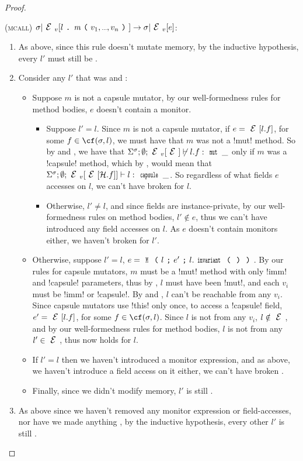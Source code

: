 \begin{proof}
\begin{ienumerate}
\item (\textsc{mcall}) $\s|\EV[l\singleDot\m\oR v_1,\ldots,v_n\cR]\rightarrow \s|\EV[e]$:
\begin{enumerate}
	\item As above, since this rule doesn't mutate memory, by the inductive hypothesis, every $l'$ must still be \CNC.
	\item Consider any $l'$ that was \WE and \NCM:
	\begin{itemize}		
		\item Suppose $m$ is not a capsule mutator, by our well-formedness rules for method bodies, $e$ doesn't contain a monitor.
		\begin{itemize}
			\item Suppose $l' = l$. Since $m$ is not a capsule mutator, if $e = \E[l.f]$, for some $f \in \cf(\s, l)$, we must have that $m$ was not a \Q!mut! method. So by  and , we have that $\Ss; \emptyset; \EV[\E] \nvdash l.f : \Kw{mut}\,\_$ only if $m$ was a \Q!capsule! method, which by , would mean that $\Ss; \emptyset; \EV[\E[\h.f]] \vdash l : \Kw{capsule}\,\_$. So regardless of what fields $e$ accesses on $l$, we can't have broken \NCM for $l$.
			\item Otherwise, $l' \neq l$, and since fields are instance-private, by our well-formedness rules on method bodies, $l' \notin e$, thus we can't have introduced any field accesses on $l$. As $e$ doesn't contain monitors either, we haven't broken \NCM for $l'$.
		\end{itemize}
		\item Otherwise, suppose $l' = l$, $e = \M{l}{e'}{l.\invariant}$. By our rules for capsule mutators, $m$ must be a \Q!mut! method with only \Q!imm! and \Q!capsule! parameters, thus by , $l$ must have been \Q!mut!, and each $v_i$ must be \Q!imm! or \Q!capsule!. By  and , $l$ can't be reachable from any $v_i$. Since capsule mutators use \Q!this! only once, to access a \Q!capsule! field, $e' = \E[l.f]$, for some $f \in \cf(\s, l)$. Since $l$ is not \reach from any $v_i$, $l \notin \E$, and by our well-formedness rules for method bodies, $l$ is not \reach from any $l' \in \E$, thus \HNO now holds for $l$.
		\item If $l' = l$ then we haven't introduced a monitor expression, and as above, we haven't introduce a field access on it either, we can't have broken \WE.
		\item Finally, since we didn't modify memory, $l'$ is still \NCM.
	\end{itemize}
	\item As above since we haven't removed any monitor expression or field-accesses, nor have we made anything \reach, by the inductive hypothesis, every other $l'$ is still \HNO.
\end{enumerate}


\end{ienumerate}
\end{proof}
